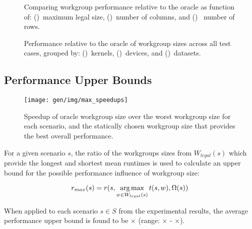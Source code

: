

\cleardoublepage
\begin{figure}

\caption{%
  Comparing workgroup performance relative to the oracle as function
  of: ()~maximum legal size,
  ()~number of columns, and
  ()~ number of rows.%
}
\label{fig:performance-wgsizes}
\end{figure}

\begin{figure}

\caption{%
  Performance relative to the oracle of workgroup sizes across all
  test cases, grouped by: ()~kernels,
  ()~devices, and
  ()~datasets.%
}
\label{fig:performances}
\end{figure}


\subsection{Performance Upper Bounds}

\begin{figure}
\texttt{[image: gen/img/max\_speedups]}
\caption{%
  Speedup of oracle workgroup size over the worst workgroup size for
  each scenario, and the statically chosen workgroup size that
  provides the best overall performance.%
}
\label{fig:speedups}
\end{figure}

For a given scenario $s$, the ratio of the workgroups sizes from
$W_{legal}(s)$ which provide the longest and shortest mean runtimes is
used to calculate an upper bound for the possible performance
influence of workgroup size:

\begin{equation}
r_{max}(s) = r(s, \operatorname*{arg\,max}_{w \in W_{legal}(s)} t(s,w), \Omega(s))
\end{equation}

When applied to each scenario $s \in S$ from the experimental results,
the average performance upper bound is found to be
$\times$ (range:
$\times$ -
$\times$).

